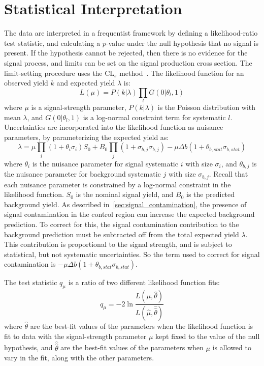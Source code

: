 \section{Statistical Interpretation}\label{sec:results_stats}

The data are interpreted in a frequentist framework by defining a likelihood-ratio test statistic, and calculating a $p$-value under the null hypothesis that no signal is present.
If the hypothesis cannot be rejected, then there is no evidence for the signal process, and limits can be set on the signal production cross section.
The limit-setting procedure uses the $\text{CL}_s$ method~\cite{results-stats-asymptotic,results-stats-cls}.
The likelihood function for an observed yield $k$ and expected yield $\lambda$ is:
\begin{equation}
    L(\mu) = P(k|\lambda)\prod_{l}G(0|\theta_{l}, 1)
\end{equation}
where $\mu$ is a signal-strength parameter, $P(k|\lambda)$ is the Poisson distribution with mean $\lambda$, and $G(0|\theta_{l}, 1)$ is a log-normal constraint term for systematic $l$.
Uncertainties are incorporated into the likelihood function as nuisance parameters, by parameterizing the expected yield as:
\begin{equation}
    \lambda = \mu\prod_{i}(1+\theta_i \sigma_i)S_0 +B_{0}\prod_j (1+\sigma_{b,j}\sigma_{b,j}) - \mu\Delta b (1+\theta_{b,stat}\sigma_{b,stat})
\end{equation}
where $\theta_i$ is the nuisance parameter for signal systematic $i$ with size $\sigma_i$, and $\theta_{b,j}$ is the nuisance parameter for background systematic $j$ with size $\sigma_{b,j}$.
Recall that each nuisance parameter is constrained by a log-normal constraint in the likelihood function.
$S_0$ is the nominal signal yield, and $B_0$ is the predicted background yield.
As described in~\ref{sec:signal_contamination}, the presence of signal contamination in the control region can increase the expected background prediction.
To correct for this, the signal contamination contribution to the background prediction must be subtracted off from the total expected yield $\lambda$.
This contribution is proportional to the signal strength, and is subject to statistical, but not systematic uncertainties.
So the term used to correct for signal contamination is $-\mu\Delta b(1+\theta_{b,stat}\sigma_{b,stat})$.

The test statistic $q_{\mu}$ is a ratio of two different likelihood function fits:
\begin{equation}
    q_{\mu} = -2\ln \frac{L(\mu, \hat{\theta})}{L(\hat{\mu}, \hat{\hat{\theta}})}
\end{equation}
where $\hat{\theta}$ are the best-fit values of the parameters when the likelihood function is fit to data with the signal-strength parameter $\mu$ kept fixed to the value of the null hypothesis,
and $\hat{\hat{\theta}}$ are the best-fit values of the parameters when $\mu$ is allowed to vary in the fit, along with the other parameters.

